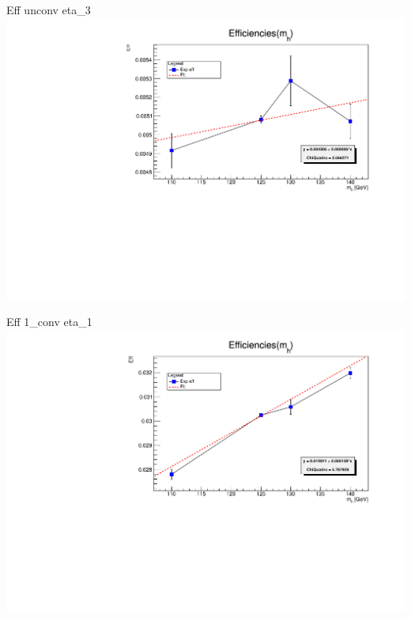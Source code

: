 \documentclass[10pt,UKenglish, leqno, xcolor = dvipsnames]{beamer}
\begin{document}
		\begin{frame}{Eff unconv eta\_3}
			\vfill
			\includegraphics[width=1.\textwidth]{../images/week_9/efficiencies_fit_unconv_eta_3.pdf}
			\vfill
		\end{frame}
	
		\begin{frame}{Eff 1\_conv eta\_1}
			\vfill
			\includegraphics[width=1.\textwidth]{../images/week_9/efficiencies_fit_1_conv_eta_1.pdf}
			\vfill
		\end{frame}
	
\end{document}

